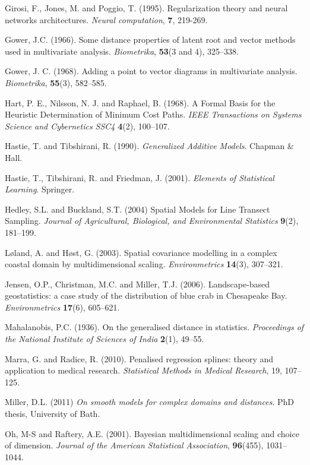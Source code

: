 \documentclass[useAMS, referee]{biom}
\begin{document}
\begin{thebibliography}{99}
\bibitem{} Girosi, F., Jones, M. and Poggio, T. (1995). Regularization theory and neural networks architectures. \textit{Neural computation}, \textbf{7}, 219-269.

\bibitem{} Gower, J.C. (1966). Some distance properties of latent root and vector methods used in multivariate analysis. \textit{Biometrika}, \textbf{53}(3 and 4), 325--338.

\bibitem{} Gower, J. C. (1968). Adding a point to vector diagrams in multivariate analysis. \textit{Biometrika}, \textbf{55}(3), 582--585.

\bibitem{} Hart, P. E., Nilsson, N. J. and Raphael, B. (1968). A Formal Basis for the Heuristic Determination of Minimum Cost Paths. \textit{IEEE Transactions on Systems Science and Cybernetics SSC4} \textbf{4}(2), 100--107.

\bibitem{} Hastie, T. and Tibshirani, R. (1990). \textit{Generalized Additive Models}. Chapman \& Hall.

\bibitem{} Hastie, T., Tibshirani, R. and Friedman, J. (2001). \textit{Elements of Statistical Learning}. Springer.

\bibitem{ } Hedley, S.L. and Buckland, S.T. (2004) Spatial Models for Line Transect Sampling. \textit{Journal of Agricultural, Biological, and Environmental Statistics} \textbf{9}(2), 181--199.

\bibitem{} L{\o}land, A. and H{\o}st, G. (2003). Spatial covariance modelling in a complex coastal domain by multidimensional scaling. \textit{Environmetrics} \textbf{14}(3), 307--321.

\bibitem{} Jensen, O.P., Christman, M.C. and Miller, T.J. (2006). Landscape-based geostatistics: a case study of the distribution of blue crab in {C}hesapeake {B}ay. \textit{Environmetrics} \textbf{17}(6), 605--621.

\bibitem{} Mahalanobis, P.C. (1936). On the generalised distance in statistics. \textit{Proceedings of the National Institute of Sciences of India} \textbf{2}(1), 49--55.

\bibitem{} Marra, G. and Radice, R. (2010). Penalised regression splines: theory and application to medical research. \textit{Statistical Methods in Medical Research}, 19, 107--125.

\bibitem{} Miller, D.L. (2011) \textit{On smooth models for complex domains and distances}. PhD thesis, University of Bath.

\bibitem{} Oh, M-S and Raftery, A.E. (2001). Bayesian multidimensional scaling and choice of dimension. \textit{Journal of the American Statistical Association}, \textbf{96}(455), 1031--1044.


\end{thebibliography}
\end{document}
